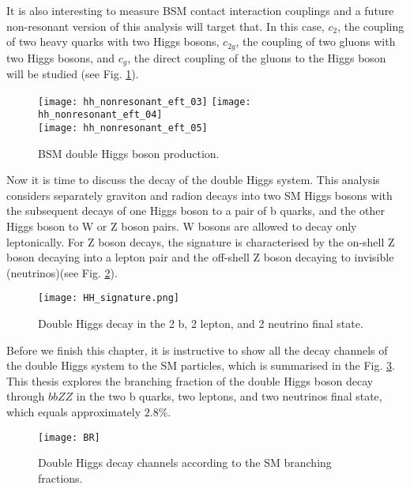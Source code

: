 It is also interesting to measure BSM contact interaction couplings and a future non-resonant version of this analysis will target that. In this case, $c_2$, the coupling of two heavy quarks with two Higgs bosons, $c_{2g}$, the coupling of two gluons with two Higgs bosons, and $c_g$, the direct coupling of the gluons to the Higgs boson will be studied (see Fig. \ref{BSM_HH}). 

\begin{figure}[H]
  \centering
    \texttt{[image: hh\_nonresonant\_eft\_03]}
    \texttt{[image: hh\_nonresonant\_eft\_04]}\\
     \texttt{[image: hh\_nonresonant\_eft\_05]}
    \caption{BSM double Higgs boson production.}
    \label{BSM_HH}
\end{figure}


Now it is time to discuss the decay of the double Higgs system. 
This analysis considers separately graviton and radion decays into two SM Higgs bosons with the subsequent decays of one Higgs boson to a pair of b quarks, and the other Higgs boson to W or Z boson pairs. W bosons are allowed to decay only leptonically. For Z boson decays, the signature is characterised by the on-shell Z boson decaying into a lepton pair and the off-shell Z boson decaying to invisible (neutrinos)(see Fig. \ref{HH_signature}). 

\begin{figure}[H]
  \centering
    \texttt{[image: HH\_signature.png]}
    \caption{Double Higgs decay in the 2 b, 2 lepton, and 2 neutrino final state. }
    \label{HH_signature}
\end{figure}

Before we finish this chapter, it is instructive to show all the decay channels of the double Higgs system to the SM particles, which is summarised in the Fig. \ref{BR}. This thesis explores the branching fraction of the double Higgs boson decay through $bbZZ$ in the two b quarks, two leptons, and two neutrinos final state, which equals approximately $2.8 \%$. 

\begin{figure}[H]
  \centering
    \texttt{[image: BR]}
    \caption{Double Higgs decay channels according to the SM branching fractions.}
    \label{BR}
\end{figure}



